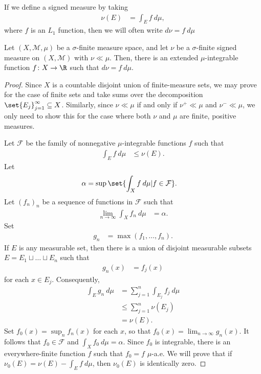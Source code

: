 \documentclass[10pt]{mypackage}
\begin{document}
\begin{remark}
  If we define a signed measure by taking
  \begin{align*}
    \nu\left( E \right) &= \int_{E}^{} f\:d\mu,
  \end{align*}
  where $f$ is an $L_1$ function, then we will often write $d\nu = f\:d\mu$
\end{remark}
\begin{theorem}
  Let $\left( X,\mathcal{M},\mu \right)$ be a $\sigma$-finite measure space, and let $\nu$ be a $\sigma$-finite signed measure on $\left( X,\mathcal{M} \right)$ with $\nu\ll\mu$. Then, there is an extended $\mu$-integrable function $f\colon X\rightarrow \R$ such that $d\nu = f\:d\mu$.
\end{theorem}
\begin{proof}
  Since $X$ is a countable disjoint union of finite-measure sets, we may prove for the case of finite sets and take sums over the decomposition $\set{E_j}_{j=1}^{\infty}\subseteq X$. Similarly, since $\nu\ll\mu$ if and only if $\nu^{+}\ll\mu$ and $\nu^{-}\ll\mu$, we only need to show this for the case where both $\nu$ and $\mu$ are finite, positive measures.\newline

  Let $\mathcal{F}$ be the family of nonnegative $\mu$-integrable functions $f$ such that
  \begin{align*}
    \int_{E}^{} f\:d\mu &\leq \nu\left( E \right).
  \end{align*}
  Let
  \begin{align*}
    \alpha &= \sup\set{ \int_{X}^{} f\:d\mu | f\in \mathcal{F} }.
  \end{align*}
  Let $\left( f_n \right)_n$ be a sequence of functions in $\mathcal{F}$ such that
  \begin{align*}
    \lim_{n\rightarrow\infty} \int_{X}^{} f_n\:d\mu &= \alpha.
  \end{align*}
  Set
  \begin{align*}
    g_n &= \max\left( f_1,\dots,f_n \right).
  \end{align*}
  If $E$ is any measurable set, then there is a union of disjoint measurable subsets $E = E_1\sqcup\dots\sqcup E_n$ such that
  \begin{align*}
    g_n(x) &= f_{j}(x)
  \end{align*}
  for each $x\in E_j$. Consequently,
  \begin{align*}
    \int_{E}^{} g_n\:d\mu &= \sum_{j=1}^{n} \int_{E_j}^{} f_j\:d\mu\\
                          &\leq \sum_{j=1}^{n} \nu\left( E_j \right)\\
                          &= \nu\left( E \right).
  \end{align*}
  Set $f_0(x) = \sup_{n} f_n(x)$ for each $x$, so that $f_0(x) = \lim_{n\rightarrow\infty}g_n(x)$. It follows that $f_0\in \mathcal{F}$ and $ \int_{X}^{} f_0\:d\mu = \alpha $. Since $f_0$ is integrable, there is an everywhere-finite function $f$ such that $f_0 = f$ $\mu$-a.e. We will prove that if $\nu_0(E) = \nu(E) - \int_{E}^{} f\:d\mu$, then $\nu_0(E)$ is identically zero.\newline


\end{proof}
\end{document}
